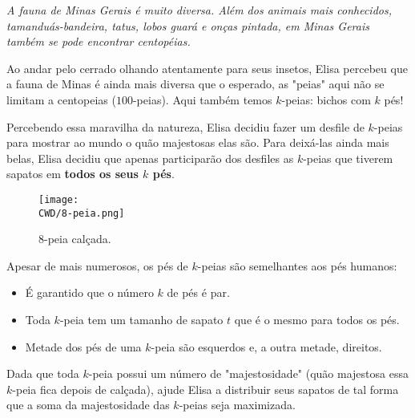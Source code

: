 %

\textit{
  A fauna de Minas Gerais é muito diversa. Além dos animais mais conhecidos, tamanduás-bandeira, tatus, lobos guará e onças pintada, em Minas Gerais também se pode encontrar centopéias. 
  }
  
  Ao andar pelo cerrado olhando atentamente para seus insetos, Elisa percebeu que a fauna de Minas é ainda mais diversa que o esperado, as "peias" aqui não se limitam a centopeias ($100$-peias). Aqui também temos $k$-peias: bichos com $k$ pés!
    
  Percebendo essa maravilha da natureza, Elisa decidiu fazer um desfile de $k$-peias para mostrar ao mundo o quão majestosas elas são. Para deixá-las ainda mais belas, Elisa decidiu que apenas participarão dos desfiles as $k$-peias que tiverem sapatos em \textbf{todos os seus $k$ pés}. 
  
  \begin{figure}[H]
    \centering
    \texttt{[image: \\CWD/8-peia.png]}
    \caption{8-peia calçada.}
  \end{figure}

  Apesar de mais numerosos, os pés de $k$-peias são semelhantes aos pés humanos:
\begin{itemize}
  \item É garantido que o número $k$ de pés é par.
  \item Toda $k$-peia tem um tamanho de sapato $t$ que é o mesmo para todos os pés.
  \item Metade dos pés de uma $k$-peia são esquerdos e, a outra metade, direitos.
\end{itemize}

Dada que toda $k$-peia possui um número de "majestosidade" (quão majestosa essa $k$-peia fica depois de calçada), ajude Elisa a distribuir seus sapatos de tal forma que a soma da majestosidade das $k$-peias seja maximizada.

%

%
%



\sampleio
